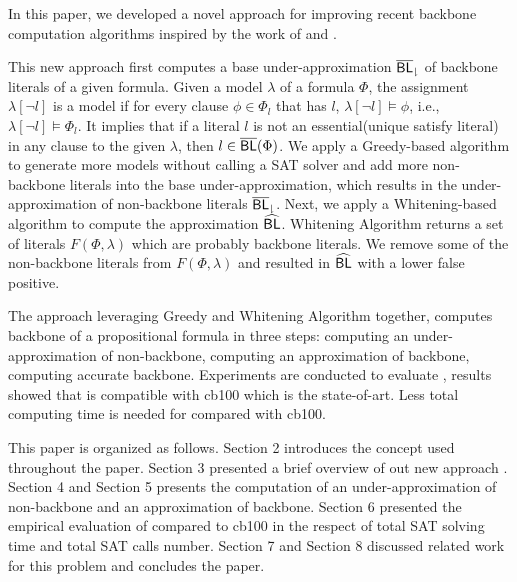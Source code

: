 In this paper, we developed a novel approach \tool for improving recent backbone computation algorithms inspired by the work of \cite{Z11} and \cite{JLM15}.

This new approach first computes a base under-approximation ${\sf \overline{BL}_\downharpoonright}$ of backbone literals of a given formula. Given a model $\lambda$ of a formula $\Phi$, the assignment $\lambda[\neg l]$ is a model if for every clause $\phi\in\Phi_l$ that has $l$, $\lambda[\neg l]\models\phi$, i.e., $\lambda[\neg l]\models\Phi_l$. It implies that if a literal $l$ is not an essential(unique satisfy literal) in any clause to the given $\lambda$, then $l\in\overline{\textsf{BL}}(\Phi)$. We apply a Greedy-based algorithm to generate more models without calling a SAT solver and add more non-backbone literals into the base under-approximation, which results in the under-approximation of non-backbone literals ${\sf \overline{BL}_\downharpoonright}$.
Next, we apply a Whitening-based algorithm to compute the approximation ${\sf \widehat{BL}}$. Whitening Algorithm returns a set of literals $F(\Phi, \lambda)$ which are probably backbone literals. We remove some of the non-backbone literals from $F(\Phi, \lambda)$ and resulted in ${\sf \widehat{BL}}$ with a lower false positive.

The approach \tool leveraging Greedy and Whitening Algorithm together, computes backbone of a propositional formula in three steps: computing an under-approximation of non-backbone, computing an approximation of backbone, computing accurate backbone. Experiments are conducted to evaluate \tool, results showed that \tool is compatible with cb100 which is the state-of-art. Less total computing time is needed for \tool compared with cb100.


This paper is organized as follows.
Section 2 introduces the concept used throughout the paper.
Section 3 presented a brief overview of out new approach \tool.
Section 4 and Section 5 presents the computation of an under-approximation of non-backbone and an approximation of backbone.
Section 6 presented the empirical evaluation of \tool compared to cb100 in the respect of total SAT solving time and total SAT calls number.
Section 7 and Section 8 discussed related work for this problem and concludes the paper.
